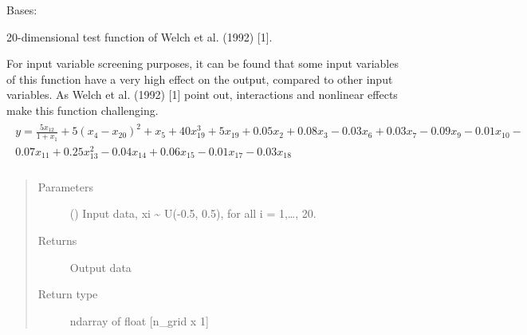 \documentclass[letterpaper,10pt,english,openany,oneside]{sphinxmanual}
\begin{document}

\begin{fulllineitems}
\label{\detokenize{pygpc.testfunctions:pygpc.testfunctions.testfunctions.Welch1992}}
Bases: {\hyperref[\detokenize{pygpc:pygpc.AbstractModel.AbstractModel}]{}}

20-dimensional test function of Welch et al. (1992) {[}1{]}.

For input variable screening purposes, it can be found that some input
variables of this function have a very high effect on the output,
compared to other input variables. As Welch et al. (1992) {[}1{]} point out,
interactions and nonlinear effects make this function challenging.
\begin{align*}\!\begin{aligned}
y = \frac{5 x_{12}}{1 + x_1} + 5 (x_4 - x_{20})^2 + x_5 + 40 x_{19}^3 + 5 x_{19} + 0.05 x_2
+ 0.08 x_3 - 0.03 x_6 + 0.03 x_7 - 0.09 x_9 - 0.01 x_{10} -\\
0.07 x_{11} + 0.25 x_{13}^2 - 0.04 x_{14} + 0.06 x_{15} - 0.01 x_{17} - 0.03 x_{18}\\
\end{aligned}\end{align*}\begin{quote}\begin{description}
\item[{Parameters}] \leavevmode
{}\sphinxstyleliteralstrong{\sphinxupquote{{[}}}\sphinxstyleliteralstrong{\sphinxupquote{{]}}} () \textendash{} Input data, xi \textasciitilde{} U(-0.5, 0.5), for all i = 1,…, 20.

\item[{Returns}] \leavevmode
{} \textendash{} Output data

\item[{Return type}] \leavevmode
ndarray of float {[}n\_grid x 1{]}

\end{description}\end{quote}

\end{fulllineitems}
\end{document}

